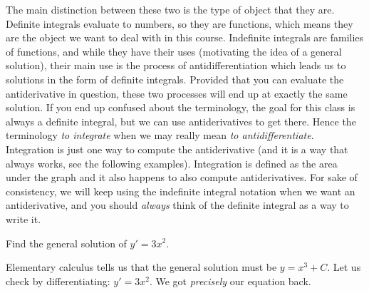 \documentclass{ximera}
\begin{document}
The main distinction between these two is the type of object that they are. Definite integrals evaluate to numbers, so they are functions, which means they are the object we want to deal with in this course. Indefinite integrals are families of functions, and while they have their uses (motivating the idea of a general solution), their main use is the process of antidifferentiation which leads us to solutions in the form of definite integrals. Provided that you can evaluate the antiderivative in question, these two processes will end up at exactly the same solution. If you end up confused about the terminology, the goal for this class is always a definite integral, but we can use antiderivatives to get there.
Hence the terminology \emph{to integrate} when we may really mean \emph{to antidifferentiate}. Integration is just one way to compute the antiderivative (and it is a way that always works, see the following examples).  Integration is defined as the area under the graph and it also happens to also compute antiderivatives. For sake of consistency, we will keep using the indefinite integral notation when we want an antiderivative, and you should \emph{always} think of the definite integral as a way to write it.

\begin{example}
    Find the general solution of $y' = 3 x^2$.
\end{example}

\begin{exampleSol}
    Elementary calculus tells us that the general solution must be $y = x^3 + C$.  Let us check by differentiating: $y' = 3x^2$.  We got \emph{precisely} our equation back.
\end{exampleSol}
\end{document}
